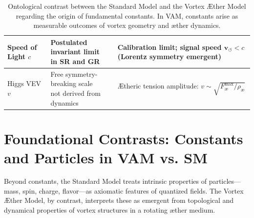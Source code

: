 \documentclass[12pt]{article}
\begin{document}
\begin{table}[H]
\begin{tabular}{|l|l|l|}
        \makecell[l]{Speed of \\ Light $c$} &
        \makecell[l]{Postulated invariant limit \\ in SR and GR} &
        \makecell[l]{Calibration limit; \\ signal speed $\mathbf{v}_{\scriptscriptstyle\boldsymbol{\circlearrowleft}} < c$ \\ (Lorentz symmetry emergent)} \\
        \hline

        \makecell[l]{Higgs VEV \\ $v$} &
        \makecell[l]{Free symmetry-breaking scale \\ not derived from dynamics} &
        \makecell[l]{Ætheric tension amplitude: \\ $v \sim \sqrt{F^{\text{max}}_{\text{\ae}} / \rho_\text{\ae}}$} \\
        \hline

    \end{tabular}
    \caption{Ontological contrast between the Standard Model and the Vortex Æther Model regarding the origin of fundamental constants. In VAM, constants arise as measurable outcomes of vortex geometry and æther dynamics.}
    \label{tab:SM_vs_VAM_constants}
\end{table}

\section*{Foundational Contrasts: Constants and Particles in VAM vs. SM}

Beyond constants, the Standard Model treats intrinsic properties of particles—mass, spin, charge, flavor—as axiomatic features of quantized fields. The Vortex Æther Model, by contrast, interprets these as emergent from topological and dynamical properties of vortex structures in a rotating æther medium.
\end{document}
